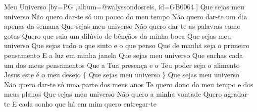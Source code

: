 \beginsong
{Meu Universo %
}[by={PG %
},album={@walyssondosreis},
id={GB0064 %
}] 
\beginverse*
Que sejas meu universo
Não quero dar-te só um pouco do meu tempo
Não quero dar-te um dia apenas da semana
\endverse
\beginverse*
Que sejas meu universo
Não quero dar-te as palavras como gotas
Quero que saia um dilúvio de bênçãos da minha boca
\endverse
\beginchorus
Que sejas meu universo
Que sejas tudo o que sinto e o que penso
Que de manhã seja o primeiro pensamento
E a luz em minha janela
Que sejas meu universo
Que enchas cada um dos meus pensamentos
Que a Tua presença e o Teu poder seja o alimento
Jesus este é o meu desejo
\{ Que sejas meu universo \}
\endchorus
\beginverse*
Que sejas meu universo
Não quero dar-te só uma parte dos meus anos
Te quero dono do meu tempo e dos meus planos
\endverse
\beginverse*
Que sejas meu universo
Não quero a minha vontade
Quero agradar-te
E cada sonho que há em mim quero entregar-te
\endverse
\begin{comment}
\lstset{basicstyle=\scriptsize\bf} %
\tab{Solo 1}
\begin{lstlisting}
E|-----------------------------------------------------|
B|-----------------------------------------------------|
G|-----------------------------------------------------|
D|-----------------------------------------------------|
A|-----------------------------------------------------|
E|-----------------------------------------------------|
\end{lstlisting}
\end{comment}
\vspace{2em} 
